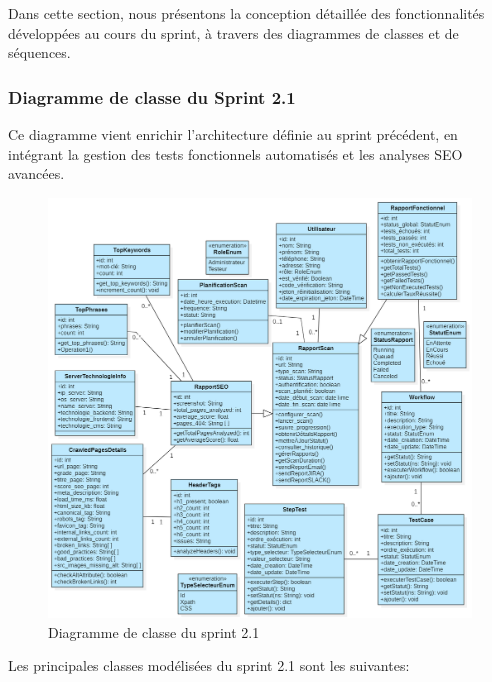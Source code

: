 Dans cette section, nous présentons la conception détaillée des fonctionnalités développées au cours du sprint, à travers des diagrammes de classes et de séquences.
\subsubsection{Diagramme de classe du Sprint 2.1}
    Ce diagramme vient enrichir l'architecture définie au sprint précédent, en intégrant la gestion des tests fonctionnels automatisés et les analyses SEO avancées.
    \begin{figure}[H]
        \centering
        \includegraphics[width=\linewidth]{chapitres/ch4Sp2/section/sprint2.1/img/classeL2-SP2.1.png}
        \caption{Diagramme de classe du sprint 2.1}
        \label{fig:classsp2}
    \end{figure}
    \vspace{-0.7cm}
    Les principales classes modélisées du sprint 2.1 sont les suivantes:
